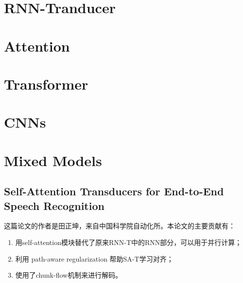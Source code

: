 {{\begin{lstlisting}
\end{lstlisting}

\section{RNN-Tranducer}

\section{Attention}

\section{Transformer}


\section{CNNs}

\section{Mixed Models}

\subsection{Self-Attention Transducers for End-to-End Speech Recognition}
这篇论文的作者是田正坤，来自中国科学院自动化所。本论文的主要贡献有：
\begin{enumerate}
  \item 用self-attention模块替代了原来RNN-T中的RNN部分，可以用于并行计算；
  \item 利用 path-aware regularization 帮助SA-T学习对齐；
  \item 使用了chunk-flow机制来进行解码。
\end{enumerate}

}}
